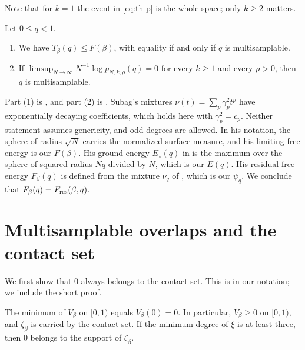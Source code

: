 Note that for $k=1$ the event in \eqref{eq:th-p} is the whole space; only $k\ge2$ matters.

\begin{theorem}\label{thm:th-subag}
Let $0\le q<1$.
\begin{enumerate}
\item We have $T_\beta(q)\le F(\beta)$, with equality if and only if $q$ is multisamplable.
\item If $\limsup_{N\to\infty}N^{-1}\log p_{N,k,\rho}(q)=0$ for every $k\ge1$ and every $\rho>0$, then $q$ is multisamplable.
\end{enumerate}
\end{theorem}

Part (1) is \cite[Theorem~5, (1.24)]{Subag2024}, and part (2) is \cite[footnote~4 to Definition~2, and Remark~25]{Subag2024}. Subag's mixtures $\nu(t)=\sum_p\gamma_p^2t^p$ have exponentially decaying coefficients, which holds here with $\gamma_p^2=c_p$. Neither statement assumes genericity, and odd degrees are allowed. In his notation, the sphere of radius $\sqrt N$ carries the normalized surface measure, and his limiting free energy is our $F(\beta)$. His ground energy $E_\star(q)$ in \cite[(1.16)]{Subag2024} is the maximum over the sphere of squared radius $Nq$ divided by $N$, which is our $E(q)$. His residual free energy $F_\beta(q)$ is defined from the mixture $\nu_q$ of \cite[(1.22)]{Subag2024}, which is our $\psi_q$. We conclude that $F_\beta(q)=F_{\rm res}(\beta,q)$.

\section{Multisamplable overlaps and the contact set}\label{sec:th-contact}

We first show that $0$ always belongs to the contact set. This is \cite[Lemma~37]{Subag2024} in our notation; we include the short proof.

\begin{lemma}\label{lem:th-zero}
The minimum of $V_\beta$ on $[0,1)$ equals $V_\beta(0)=0$. In particular, $V_\beta\ge0$ on $[0,1)$, and $\zeta_\beta$ is carried by the contact set. If the minimum degree of $\xi$ is at least three, then $0$ belongs to the support of $\zeta_\beta$.
\end{lemma}

